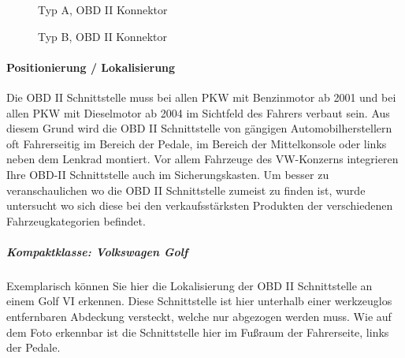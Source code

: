 \begin{figure}[!htb]\centering
   \begin{minipage}{0.49\textwidth}
     \caption{Typ A, OBD II Konnektor \cite{OBDII.TypeA}}\label{Fig:Data1}
   \end{minipage}
   \begin {minipage}{0.49\textwidth}
     \caption{Typ B, OBD II Konnektor \cite{OBDII.TypeB}}\label{Fig:Data2}
   \end{minipage}
\end{figure}

\paragraph{Positionierung / Lokalisierung}
Die OBD II Schnittstelle muss bei allen PKW mit Benzinmotor ab 2001 und bei allen PKW mit Dieselmotor ab 2004 im Sichtfeld des Fahrers verbaut sein. Aus diesem Grund wird die OBD II Schnittstelle von gängigen Automobilherstellern oft Fahrerseitig im Bereich der Pedale, im Bereich der Mittelkonsole oder links neben dem Lenkrad montiert. Vor allem Fahrzeuge des VW-Konzerns integrieren Ihre OBD-II Schnittstelle auch im Sicherungskasten. Um besser zu veranschaulichen wo die OBD II Schnittstelle zumeist zu finden ist, wurde untersucht wo sich diese bei den verkaufsstärksten Produkten der verschiedenen Fahrzeugkategorien befindet.
\subparagraph{Kompaktklasse: Volkswagen Golf}
Exemplarisch können Sie hier die Lokalisierung der OBD II Schnittstelle an einem Golf VI erkennen. Diese Schnittstelle ist hier unterhalb einer werkzeuglos entfernbaren Abdeckung versteckt, welche nur abgezogen werden muss. Wie auf dem Foto erkennbar ist die Schnittstelle hier im Fußraum der Fahrerseite, links der Pedale. 


